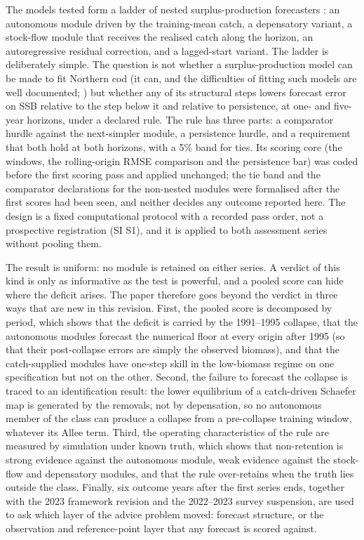 \documentclass[preprint,11pt,authoryear]{elsarticle}
\theoremstyle{definition}
\theoremstyle{remark}
\begin{document}
The models tested form a ladder of nested surplus-production forecasters \citep{Schaefer1954,Pella1969}: an autonomous module driven by the training-mean catch, a depensatory variant, a stock-flow module that receives the realised catch along the horizon, an autoregressive residual correction, and a lagged-start variant. The ladder is deliberately simple. The question is not whether a surplus-production model can be made to fit Northern cod (it can, and the difficulties of fitting such models are well documented; \citealp{LudwigWalters1985,Polacheck1993,Punt2003,PedersenBerg2017}) but whether any of its structural steps lowers forecast error on SSB relative to the step below it and relative to persistence, at one- and five-year horizons, under a declared rule. The rule has three parts: a comparator hurdle against the next-simpler module, a persistence hurdle, and a requirement that both hold at both horizons, with a 5\% band for ties. Its scoring core (the windows, the rolling-origin RMSE comparison and the persistence bar) was coded before the first scoring pass and applied unchanged; the tie band and the comparator declarations for the non-nested modules were formalised after the first scores had been seen, and neither decides any outcome reported here. The design is a fixed computational protocol with a recorded pass order, not a prospective registration (SI S1), and it is applied to both assessment series without pooling them.

The result is uniform: no module is retained on either series. A verdict of this kind is only as informative as the test is powerful, and a pooled score can hide where the deficit arises. The paper therefore goes beyond the verdict in three ways that are new in this revision. First, the pooled score is decomposed by period, which shows that the deficit is carried by the 1991--1995 collapse, that the autonomous modules forecast the numerical floor at every origin after 1995 (so that their post-collapse errors are simply the observed biomass), and that the catch-supplied modules have one-step skill in the low-biomass regime on one specification but not on the other. Second, the failure to forecast the collapse is traced to an identification result: the lower equilibrium of a catch-driven Schaefer map is generated by the removals, not by depensation, so no autonomous member of the class can produce a collapse from a pre-collapse training window, whatever its Allee term. Third, the operating characteristics of the rule are measured by simulation under known truth, which shows that non-retention is strong evidence against the autonomous module, weak evidence against the stock-flow and depensatory modules, and that the rule over-retains when the truth lies outside the class. Finally, six outcome years after the first series ends, together with the 2023 framework revision and the 2022--2023 survey suspension, are used to ask which layer of the advice problem moved: forecast structure, or the observation and reference-point layer that any forecast is scored against.
\end{document}
